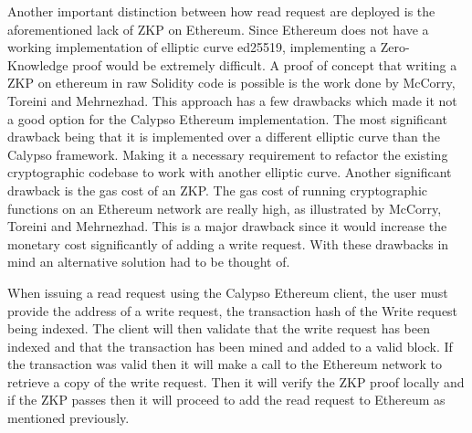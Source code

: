 \documentclass[12pt]{article}
\begin{document}
Another important distinction between how read request are deployed is the aforementioned lack of ZKP on Ethereum. Since Ethereum does not have a working implementation of elliptic curve ed25519, implementing a Zero-Knowledge proof would be extremely difficult. A proof of concept that writing a ZKP on ethereum in raw Solidity code is possible is the work done by McCorry, Toreini and Mehrnezhad\cite{Toreini2016RemovingTT}. This approach has a few drawbacks which made it not a good option for the Calypso Ethereum implementation. The most significant drawback being that it is implemented over a different elliptic curve than the Calypso framework. Making it a necessary requirement to refactor the existing cryptographic codebase to work with another elliptic curve. Another significant drawback is the gas cost of an ZKP. The gas cost of running cryptographic functions on an  Ethereum network are really high, as illustrated by McCorry, Toreini and Mehrnezhad\cite{Toreini2016RemovingTT}. This is a major drawback since it would increase the monetary cost significantly of adding a write request.  With these drawbacks in mind an alternative solution had to be thought of.

When issuing a read request using the Calypso Ethereum client, the user must provide the address of a write request, the transaction hash of the Write request being indexed. The client will then validate that the write request has been indexed and that the transaction has been mined and added to a valid block. If the transaction was valid then it will make a call to the Ethereum network to retrieve a copy of the write request. Then it will verify the ZKP proof locally and if the ZKP passes then it will proceed to add the read request to Ethereum as mentioned previously.
\end{document}
